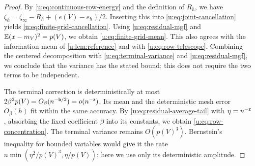 \begin{proof}
By \eqref{u:eq:continuous-row-energy} and the definition of $R_h$, we have $\zeta_h=\zeta_\infty-R_h+(e(V)-e_h)/2$.
Inserting this into \eqref{u:eq:joint-cancellation} yields \eqref{u:eq:finite-grid-cancellation}. Using \eqref{u:eq:residual-mgf} and $\mathbb E(x-m_V)^2=p(V)$, we obtain \eqref{u:eq:finite-grid-mean}. This also agrees with the information mean of \cref{u:lem:reference} and with \eqref{u:eq:row-telescope}. Combining the centered decomposition with \eqref{u:eq:terminal-variance} and \eqref{u:eq:residual-mgf}, we conclude that the variance has the stated bound; this does not require the two terms to be independent.

The terminal correction is deterministically at most $2\beta^2p(V)=O_\beta(n^{-\mathsf{b}/2})=o(n^{-\mathsf{z}})$. Its mean and the deterministic mesh error $O_\beta(h)$ fit within the same accuracy. By \eqref{u:eq:residual-average-tail} with $\eta=n^{-\mathsf{z}}$, absorbing the fixed coefficient $\beta$ into its constants, we obtain \eqref{u:eq:row-concentration}. The terminal variance remains $O(p(V)^3)$. Bernstein's inequality for bounded variables
\cite[Theorem~2.10 and Corollary~2.11]{boucheron-lugosi-massart-2013}
would give it the rate $n\min(\eta^2/p(V)^3,\eta/p(V))$; here we use only its deterministic amplitude.
\end{proof}

